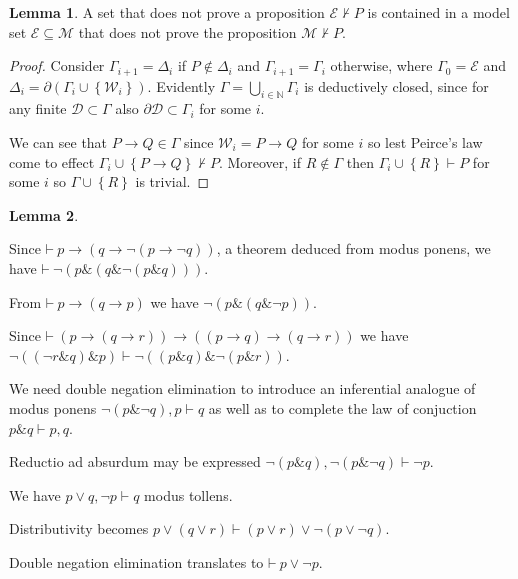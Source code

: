\documentclass{amsbook}
\newcommand{\setsm}[1]{\left\{#1\right\}}
\newcommand{\wffs}{\mathcal W}
\newcommand{\infers}{\mathrel\vdash}
\newcommand{\theorem}{\mathord\vdash\medspace}
\newcommand{\then}{\mathrel\rightarrow}
\newcommand{\conj}{\mathrel\&}
\newcommand{\disj}{\mathrel\vee}
\theoremstyle{definition}
\newtheorem{lmm}{Lemma}[section]
\begin{document}
\begin{lmm}
    A set that does not prove a proposition $\mathcal E \nvdash P$ is contained in a model set $\mathcal E \subseteq \mathcal M$ that does not prove the proposition $\mathcal M \nvdash P$.
    \begin{proof}
        Consider $\Gamma_{i+1} = \Delta_i$ if $P \notin \Delta_i$ and $\Gamma_{i+1} = \Gamma_i$ otherwise, where $\Gamma_0 = \mathcal E$ and $\Delta_i = \partial(\Gamma_i \cup \setsm {\wffs_i})$.
        Evidently $\Gamma = \bigcup_{i \in \mathbb N} \Gamma_i$ is deductively closed, since for any finite $\mathcal D \subset \Gamma$ also $\partial\mathcal D \subset \Gamma_i$ for some $i$.

        We can see that $P \then Q \in \Gamma$ since $\wffs_i = P \then Q$ for some $i$ so lest Peirce's law come to effect $\Gamma_i \cup \setsm{P \then Q} \nvdash P$. Moreover, if $R \notin \Gamma$ then $\Gamma_i \cup \setsm R \infers P$ for some $i$ so $\Gamma \cup \setsm R$ is trivial.
    \end{proof}
\end{lmm}

\begin{lmm}

\end{lmm}


\newpage

Since $\theorem p \then (q \then \neg(p \then \neg q))$, a theorem deduced from modus ponens, we have $\theorem \neg(p \conj (q \conj \neg(p \conj q)))$.

From $\theorem p \then (q \then p)$ we have $\neg(p \conj (q \conj \neg p)) $.

Since $\theorem (p \then (q \then r)) \then ((p \then q) \then (q \then r))$ we have $\neg((\neg r \conj q) \conj p) \infers \neg((p \conj q) \conj \neg(p \conj r))$.

We need double negation elimination to introduce an inferential analogue of modus ponens $\neg(p \conj \neg q), p \infers q$ as well as to complete the law of conjuction $p \conj q \infers p, q$.

Reductio ad absurdum may be expressed $\neg(p \conj q), \neg(p \conj \neg q) \infers \neg p$.



We have $p \disj q, \neg p \infers q$ modus tollens.

Distributivity becomes $p \disj (q \disj r) \infers (p \disj r) \disj \neg(p \disj \neg q)$.

Double negation elimination translates to $\theorem p \disj \neg p$.
\end{document}
